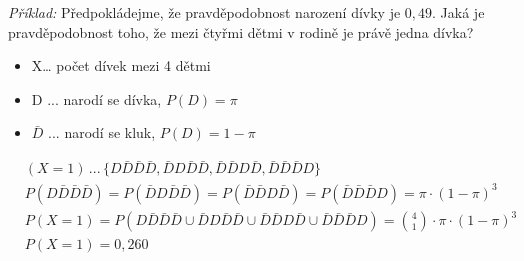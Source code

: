 \textit{Příklad:} Předpokládejme, že pravděpodobnost narození dívky je $0,49$. Jaká je pravděpodobnost toho, že mezi čtyřmi dětmi v rodině je právě jedna dívka?
\begin{itemize}
\item X… počet dívek mezi 4 dětmi 
\item D ... narodí se dívka, $P(D) = \pi$ 
\item $\bar{D}$ ...  narodí se kluk, $P(D) = 1 - \pi$
\end{itemize}
\begin{equation*}
\begin{split}
&(X = 1) \,... \, \{D\bar{D}\bar{D}\bar{D},\bar{D}D\bar{D}\bar{D},\bar{D}\bar{D}D\bar{D},\bar{D}\bar{D}\bar{D}D\} \\
&P(D\bar{D}\bar{D}\bar{D}) = P(\bar{D}D\bar{D}\bar{D}) = P(\bar{D}\bar{D}D\bar{D}) = P(\bar{D}\bar{D}\bar{D}D) = \pi \cdot (1 - \pi)^3 \\
&P(X = 1) = P(D\bar{D}\bar{D}\bar{D} \cup \bar{D}D\bar{D}\bar{D} \cup \bar{D}\bar{D}D\bar{D} \cup \bar{D}\bar{D}\bar{D}D) = \binom{4}{1} \cdot \pi \cdot (1 - \pi)^3 \\
&P(X = 1) = 0,260
\end{split}
\end{equation*}


